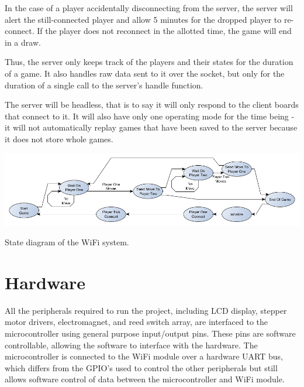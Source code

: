 \documentclass[12pt]{article}
\begin{document}
\indent  

In the case of a player accidentally disconnecting from the server, the server will alert the still-connected player and allow 5 minutes for the dropped player to re-connect. If the player does not reconnect in the allotted time, the game will end in a draw. 

\indent

Thus, the server only keeps track of the players and their states for the duration of a game. It also handles raw data sent to it over the socket, but only for the duration of a single call to the server's handle function.

\indent

The server will be headless, that is to say it will only respond to the client boards that connect to it. It will also have only one operating mode for the time being - it will not automatically replay games that have been saved to the server because it does not store whole games.

\vspace*{5mm}

\centerline{\includegraphics[scale=.5]{Server_State}}

\begin{center}
State diagram of the WiFi system.
\end{center}

\vspace*{5mm}

\section*{Hardware}
\indent

All the peripherals required to run the project, including LCD display, stepper motor drivers, electromagnet, and reed switch array, are interfaced to the microcontroller using general purpose input/output pins. These pins are software controllable, allowing the software to interface with the hardware. The microcontroller is connected to the WiFi module over a hardware UART bus, which differs from the GPIO's used to control the other peripherals but still allows software control of data between the microcontroller and WiFi module.
\end{document}
